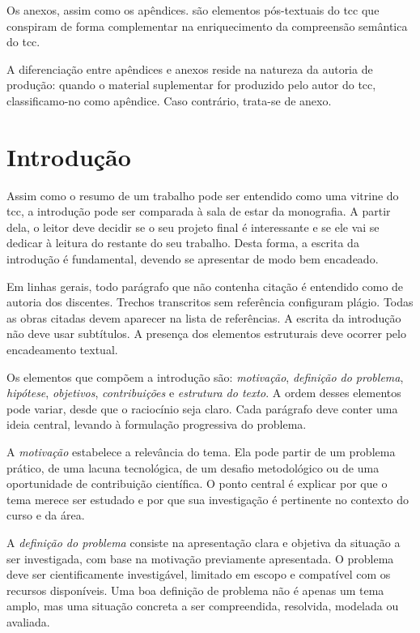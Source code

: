 \documentclass{eic-bcc-tcc}
\begin{document}
Os anexos, assim como os apêndices. são elementos pós-textuais do \gls{tcc} que conspiram de forma complementar na enriquecimento da compreensão semântica do \gls{tcc}.

A diferenciação entre apêndices e anexos reside na natureza da autoria de produção: quando o material suplementar for produzido pelo autor do \gls{tcc}, classificamo-no como apêndice. Caso contrário, trata-se de anexo.


\chapter{Introdução}
\label{cha:introducao}

Assim como o resumo de um trabalho pode ser entendido como uma vitrine do \gls{tcc}, a introdução pode ser comparada à sala de estar da monografia. A partir dela, o leitor deve decidir se o seu projeto final é interessante e se ele vai se dedicar à leitura do restante do seu trabalho. Desta forma, a escrita da introdução é fundamental, devendo se apresentar de modo bem encadeado.

Em linhas gerais, todo parágrafo que não contenha citação é entendido como de autoria dos discentes. Trechos transcritos sem referência configuram plágio. Todas as obras citadas devem aparecer na lista de referências. A escrita da introdução não deve usar subtítulos. A presença dos elementos estruturais deve ocorrer pelo encadeamento textual.

Os elementos que compõem a introdução são: \emph{motivação}, \emph{definição do problema}, \emph{hipótese}, \emph{objetivos}, \emph{contribuições} e \emph{estrutura do texto}. A ordem desses elementos pode variar, desde que o raciocínio seja claro. Cada parágrafo deve conter uma ideia central, levando à formulação progressiva do problema.

A \emph{motivação} estabelece a relevância do tema. Ela pode partir de um problema prático, de uma lacuna tecnológica, de um desafio metodológico ou de uma oportunidade de contribuição científica. O ponto central é explicar por que o tema merece ser estudado e por que sua investigação é pertinente no contexto do curso e da área.

A \emph{definição do problema} consiste na apresentação clara e objetiva da situação a ser investigada, com base na motivação previamente apresentada. O problema deve ser cientificamente investigável, limitado em escopo e compatível com os recursos disponíveis. Uma boa definição de problema não é apenas um tema amplo, mas uma situação concreta a ser compreendida, resolvida, modelada ou avaliada.
\end{document}
